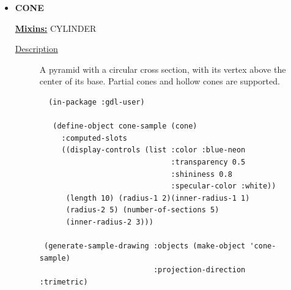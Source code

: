 \documentclass [11pt]{book}
\begin{document}
\begin{itemize}







\item {}
\textbf{CONE}


\textbf{
\underline{Mixins:}} CYLINDER





\begin{description}

\item [
\underline{Description}]


A pyramid with a circular cross section, with its vertex above 
the center of its base. Partial cones and hollow cones are supported.



\end{description}




\begin{figure}
\begin{lrbox}{\boxedverb}
\begin{minipage}{\linewidth}
{\small

\begin{verbatim}
  (in-package :gdl-user)

   (define-object cone-sample (cone)
     :computed-slots
     ((display-controls (list :color :blue-neon 
                              :transparency 0.5 
                              :shininess 0.8 
                              :specular-color :white))
      (length 10) (radius-1 2)(inner-radius-1 1)
      (radius-2 5) (number-of-sections 5)
      (inner-radius-2 3)))
  
 (generate-sample-drawing :objects (make-object 'cone-sample) 
                          :projection-direction :trimetric) 
  

\end{verbatim}}
\end{minipage}
\end{lrbox}
\end{figure}
\end{itemize}
\end{document}
